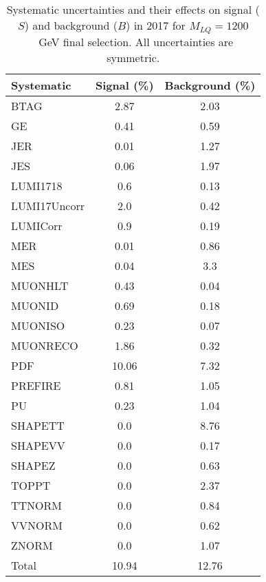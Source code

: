 \begin{table}[htbp]
\begin{center}
\caption{Systematic uncertainties and their effects on signal ($S$) and background ($B$) in 2017 for $M_{LQ}=1200$~GeV final selection. All uncertainties are symmetric.}
\begin{tabular}{lcc}
\hline\hline
Systematic & Signal (\%) & Background (\%) \\ \hline 
BTAG & 2.87 & 2.03\\ 
GE & 0.41 & 0.59\\ 
JER & 0.01 & 1.27\\ 
JES & 0.06 & 1.97\\ 
LUMI1718 & 0.6 & 0.13\\ 
LUMI17Uncorr & 2.0 & 0.42\\ 
LUMICorr & 0.9 & 0.19\\ 
MER & 0.01 & 0.86\\ 
MES & 0.04 & 3.3\\ 
MUONHLT & 0.43 & 0.04\\ 
MUONID & 0.69 & 0.18\\ 
MUONISO & 0.23 & 0.07\\ 
MUONRECO & 1.86 & 0.32\\ 
PDF & 10.06 & 7.32\\ 
PREFIRE & 0.81 & 1.05\\ 
PU & 0.23 & 1.04\\ 
SHAPETT & 0.0 & 8.76\\ 
SHAPEVV & 0.0 & 0.17\\ 
SHAPEZ & 0.0 & 0.63\\ 
TOPPT & 0.0 & 2.37\\ 
TTNORM & 0.0 & 0.84\\ 
VVNORM & 0.0 & 0.62\\ 
ZNORM & 0.0 & 1.07\\ 
Total & 10.94 & 12.76\\ \hline \hline
\end{tabular}
\label{tab:SysUncertainties_uujj_1200}
\end{center}
\end{table}

